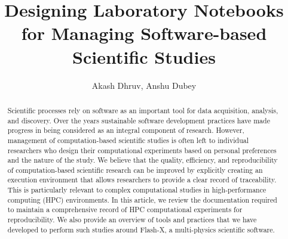 \documentclass{IEEEcsmag}
\begin{document}

\title{Designing Laboratory Notebooks for Managing Software-based Scientific Studies}
   
\author{ Akash Dhruv, Anshu Dubey}


\begin{abstract}
%
Scientific processes rely on software as an important tool for data acquisition, analysis, and discovery. Over the years sustainable software development practices have made progress in being considered as an integral component of research. However, management of computation-based scientific studies is often left to individual researchers who design their computational experiments based on personal preferences and the nature of the study. 
We believe that the quality, efficiency, and reproducibility of computation-based scientific research can be improved by explicitly creating an execution environment that allows researchers to provide a clear record of traceability. This is particularly relevant to complex computational studies in high-performance computing (HPC) environments.
In this article, we review the documentation required to maintain a comprehensive record of  HPC computational experiments for reproducibility. We also provide an overview of tools and practices that we have developed to perform such 
studies around Flash-X, a multi-physics scientific software.

\end{abstract}
\end{document}
